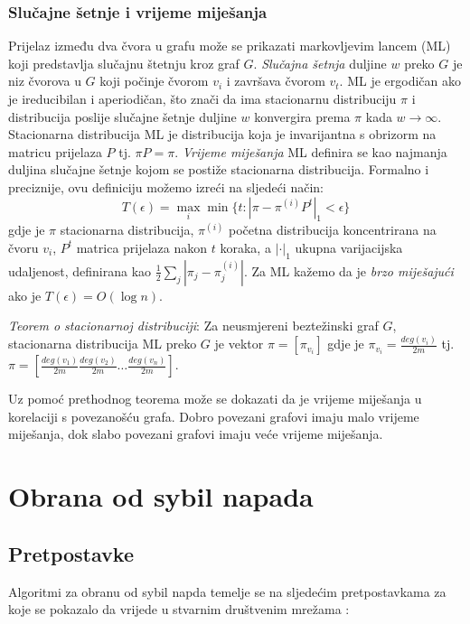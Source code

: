 \documentclass[times, utf8, seminar, numeric]{fer}
\begin{document}
\subsection{Slučajne šetnje i vrijeme miješanja}
Prijelaz između dva čvora u grafu može se prikazati markovljevim lancem (ML) koji predstavlja slučajnu štetnju kroz graf $G$. \textit{Slučajna šetnja} duljine $w$ preko $G$ je niz čvorova u $G$ koji počinje čvorom $v_i$ i završava čvorom $v_t$. ML je ergodičan  ako je ireducibilan i aperiodičan, što znači da ima stacionarnu distribuciju $\pi$ i distribucija poslije slučajne šetnje duljine $w$ konvergira prema $\pi$ kada $w \to \infty$. Stacionarna distribucija ML je distribucija koja je invarijantna s obrizorm na matricu prijelaza $P$ tj. $\pi P = \pi$. \textit{Vrijeme miješanja}  ML definira se kao najmanja duljina slučajne šetnje kojom se postiže stacionarna distribucija. Formalno i preciznije, ovu definiciju možemo izreći na sljedeći način:
\begin{equation} \label{eq:mixing}
  T(\epsilon) = \max_{i} \min \{t : |\pi - \pi^{(i)} P^t|_1 < \epsilon\}
\end{equation}
gdje je $\pi$ stacionarna distribucija, $\pi^{(i)}$ početna distribucija koncentrirana na čvoru $v_i$, $P^t$ matrica prijelaza nakon $t$ koraka, a $|\cdot|_1$ ukupna varijacijska udaljenost, definirana kao $\frac{1}{2} \sum_{j} |\pi_j - \pi_j^{(i)}|$. Za ML kažemo da je \textit{brzo miješajući}  ako je $T(\epsilon) = O(\log n)$. \cite{friends} 

\textit{Teorem o stacionarnoj distribuciji}: Za neusmjereni beztežinski graf $G$, stacionarna distribucija ML preko $G$ je vektor $\pi = [\pi_{v_i}]$ gdje je $\pi_{v_i} = \frac{deg (v_i)}{2 m}$ tj. $\pi = [\frac{deg (v_1)}{2 m} \frac{deg (v_2)}{2 m} \dots \frac{deg (v_n)}{2 m}]$.

Uz pomoć prethodnog teorema može se dokazati da je vrijeme miješanja u korelaciji s povezanošću grafa. Dobro povezani grafovi imaju malo vrijeme miješanja, dok slabo povezani grafovi imaju veće vrijeme miješanja. \cite{friends}

\chapter{Obrana od sybil napada} \label{ch:defense}

\section{Pretpostavke}
Algoritmi za obranu od sybil napda temelje se na sljedećim pretpostavkama za koje se pokazalo da vrijede u stvarnim društvenim mrežama \cite{sybil-defender}:
\end{document}
